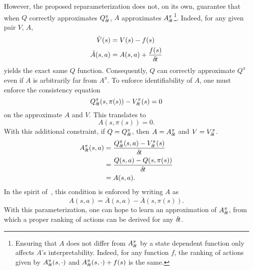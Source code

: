 However, the proposed reparameterization does not, on its own, guarantee that
when $Q$ correctly approximates $Q^\pi_{\delta\hspace{-.1em}t}$, $A$ approximates $A^\pi_{\delta\hspace{-.1em}t}$\footnote{
	Ensuring that $A$ does not differ from $A^\pi_{\delta\hspace{-.1em}t}$ by a state dependent function only affects
	$A$'s interpretability. Indeed, for any function $f$, the ranking of actions given by
	$A^\pi_{\delta\hspace{-.1em}t}(s, \cdot)$ and $A^\pi_{\delta\hspace{-.1em}t}(s, \cdot) + f(s)$ is the same.
}.
Indeed, for any given pair $V$, $A$,
\begin{align}
	\tilde{V}(s) &= V(s) - f(s)\\
	\tilde{A}(s, a) &= A(s, a) + \frac{f(s)}{{\delta\hspace{-.1em}t}}
\end{align}
yields the exact same $Q$ function. Consequently, $Q$ can correctly approximate
$Q^\pi$ even if $A$ is arbitrarily far from $A^\pi$.
To enforce identifiability of $A$, one must enforce the consistency equation
\begin{equation}
	Q^\pi_{\delta\hspace{-.1em}t}(s, \pi(s)) - V^\pi_{\delta\hspace{-.1em}t}(s) = 0
\end{equation}
on the approximate $A$ and $V$. This translates to
\begin{equation}
	A(s, \pi(s)) = 0.
\end{equation}
With this additional constraint, if $Q = Q^\pi_{\delta\hspace{-.1em}t}$, then $A = A^\pi_{\delta\hspace{-.1em}t}$ and $V = V^\pi_{\delta\hspace{-.1em}t}$.
\begin{align}
	A^\pi_{\delta\hspace{-.1em}t}(s, a) &= \frac{Q^\pi_{\delta\hspace{-.1em}t}(s,a) - V^\pi_{\delta\hspace{-.1em}t}(s)}{{\delta\hspace{-.1em}t}}\\
		    &= \frac{Q(s,a) - Q(s, \pi(s))}{{\delta\hspace{-.1em}t}}\\
		    &= A(s, a).
\end{align}
In the spirit of~\cite{dueling_nets}, this condition is enforced by writing $A$ as
\begin{equation}
\label{eq:Aparam}
	A(s, a) = \bar{A}(s, a) - \bar{A}(s, \pi(s)).
\end{equation}
With this parameterization, one can hope to learn an approximation of $A^\pi_{\delta\hspace{-.1em}t}$,
from which a proper ranking of actions can be derived for any ${\delta\hspace{-.1em}t}$.

